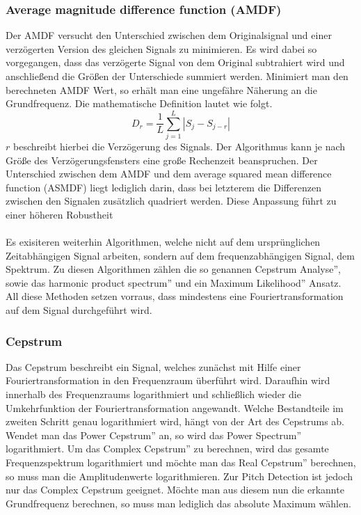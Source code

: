 \subsubsection*{Average magnitude difference function (AMDF)}
Der AMDF versucht den Unterschied zwischen dem Originalsignal und einer verzögerten Version des gleichen Signals zu minimieren. Es wird dabei so vorgegangen, dass das verzögerte Signal von dem Original subtrahiert wird und anschließend die Größen der Unterschiede summiert werden. Minimiert man den berechneten AMDF Wert, so erhält man eine ungefähre Näherung an die Grundfrequenz. \cite{ross1974average} Die mathematische Definition lautet wie folgt.
$$ D_r = \frac{1}{L} \sum_{j=1}^L |S_j - S_{j-r}| $$
$r$ beschreibt hierbei die Verzögerung des Signals. Der Algorithmus kann je nach Größe des Verzögerungsfensters eine große Rechenzeit beanspruchen. Der Unterschied zwischen dem AMDF und dem average squared mean difference function (ASMDF) liegt lediglich darin, dass bei letzterem die Differenzen zwischen den Signalen zusätzlich quadriert werden. Diese Anpassung führt zu einer höheren Robustheit
\\\\
Es exisiteren weiterhin Algorithmen, welche nicht auf dem ursprünglichen Zeitabhängigen Signal arbeiten, sondern auf dem frequenzabhängigen Signal, dem Spektrum. Zu diesen Algorithmen zählen die so genannen \glqq Cepstrum Analyse'', sowie das \glqq harmonic product spectrum'' und ein \glqq Maximum Likelihood'' Ansatz. All diese Methoden setzen vorraus, dass mindestens eine Fouriertransformation auf dem Signal durchgeführt wird.

\subsubsection*{Cepstrum}
Das Cepstrum beschreibt ein Signal, welches zunächst mit Hilfe einer Fouriertransformation in den Frequenzraum überführt wird. Daraufhin wird innerhalb des Frequenzraums logarithmiert und schließlich wieder die Umkehrfunktion der Fouriertransformation angewandt. Welche Bestandteile im zweiten Schritt genau logarithmiert wird, hängt von der Art des Cepstrums ab. Wendet man das \glqq Power Cepstrum'' an, so wird das \glqq Power Spectrum'' logarithmiert. Um das \glqq Complex Cepstrum'' zu berechnen, wird das gesamte Frequenzspektrum logarithmiert und möchte man das \glqq Real Cepstrum'' berechnen, so muss man die Amplitudenwerte logarithmieren.  \cite{oppenheim2004frequency} Zur Pitch Detection ist jedoch nur das Complex Cepstrum geeignet. Möchte man aus diesem nun die erkannte Grundfrequenz berechnen, so muss man lediglich das absolute Maximum wählen. 

